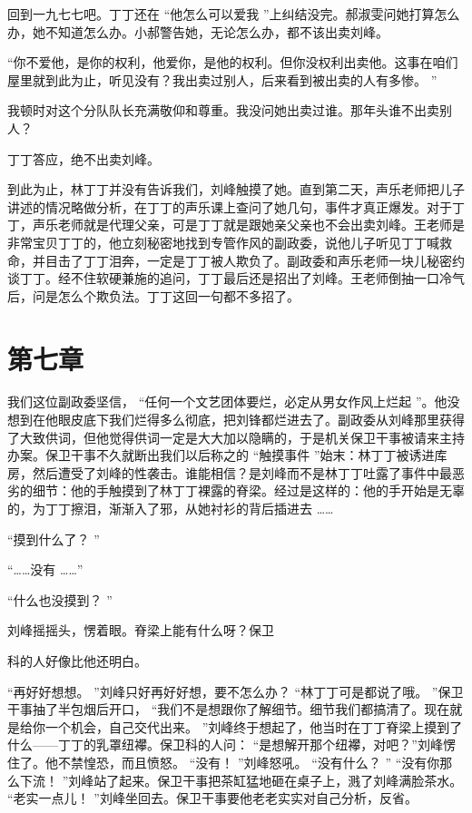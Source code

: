 \documentclass[12pt,twoside,openany]{book}
\begin{document}
回到一九七七吧。丁丁还在 “他怎么可以爱我 ”上纠结没完。郝淑雯问她打算怎么办，她不知道怎么办。小郝警告她，无论怎么办，都不该出卖刘峰。

“你不爱他，是你的权利，他爱你，是他的权利。但你没权利出卖他。这事在咱们屋里就到此为止，听见没有？我出卖过别人，后来看到被出卖的人有多惨。 ”

我顿时对这个分队队长充满敬仰和尊重。我没问她出卖过谁。那年头谁不出卖别人？

丁丁答应，绝不出卖刘峰。

到此为止，林丁丁并没有告诉我们，刘峰触摸了她。直到第二天，声乐老师把儿子讲述的情况略做分析，在丁丁的声乐课上查问了她几句，事件才真正爆发。对于丁丁，声乐老师就是代理父亲，可是丁丁就是跟她亲父亲也不会出卖刘峰。王老师是非常宝贝丁丁的，他立刻秘密地找到专管作风的副政委，说他儿子听见丁丁喊救命，并目击了丁丁泪奔，一定是丁丁被人欺负了。副政委和声乐老师一块儿秘密约谈丁丁。经不住软硬兼施的追问，丁丁最后还是招出了刘峰。王老师倒抽一口冷气后，问是怎么个欺负法。丁丁这回一句都不多招了。

\chapter{第七章}

我们这位副政委坚信， “任何一个文艺团体要烂，必定从男女作风上烂起 ”。他没想到在他眼皮底下我们烂得多么彻底，把刘锋都烂进去了。副政委从刘峰那里获得了大致供词，但他觉得供词一定是大大加以隐瞒的，于是机关保卫干事被请来主持办案。保卫干事不久就断出我们以后称之的 “触摸事件 ”始末：林丁丁被诱进库房，然后遭受了刘峰的性袭击。谁能相信？是刘峰而不是林丁丁吐露了事件中最恶劣的细节：他的手触摸到了林丁丁裸露的脊梁。经过是这样的：他的手开始是无辜的，为丁丁擦泪，渐渐入了邪，从她衬衫的背后插进去 ……

“摸到什么了？ ”

“……没有 ……”

“什么也没摸到？ ”

刘峰摇摇头，愣着眼。脊梁上能有什么呀？保卫

科的人好像比他还明白。

“再好好想想。 ”刘峰只好再好好想，要不怎么办？ “林丁丁可是都说了哦。 ”保卫干事抽了半包烟后开口， “我们不是想跟你了解细节。细节我们都搞清了。现在就是给你一个机会，自己交代出来。 ”刘峰终于想起了，他当时在丁丁脊梁上摸到了什么——丁丁的乳罩纽襻。保卫科的人问： “是想解开那个纽襻，对吧？”刘峰愣住了。他不禁惶恐，而且愤怒。 “没有！ ”刘峰怒吼。 “没有什么？ ” “没有你那么下流！ ”刘峰站了起来。保卫干事把茶缸猛地砸在桌子上，溅了刘峰满脸茶水。 “老实一点儿！ ”刘峰坐回去。保卫干事要他老老实实对自己分析，反省。
\end{document}
